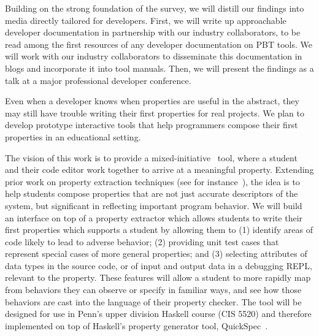 Building on the strong foundation of the survey, we will distill our findings
into media directly tailored for developers. First, we will write up
approachable developer documentation in partnership with our industry
collaborators, to be read among the first resources of any developer
documentation on PBT tools. We will work with our industry collaborators to
disseminate this documentation in blogs and incorporate it into tool
manuals. Then, we will present the findings as a talk at a
major professional developer conference.

%
Even when a developer knows when properties are useful in the abstract,
they may still have trouble writing their first properties
for real projects. We plan to develop prototype interactive tools that help
programmers compose their first properties in an educational setting.

The vision of this work is to provide a mixed-initiative~\cite{ref:allen1999mixed}
tool, where a student and their code editor work together to arrive at a
meaningful property. Extending prior work on property extraction techniques (see for
instance~\cite{ref:ammons2002mining, ref:le2018deep, ref:claessen2010quickspec,
smith_discovering_2017}), the idea is to help students compose properties that
are not just accurate descriptors of the system, but significant in reflecting
important program behavior. We will build an interface on top of a property
extractor which allows students to write their first properties which supports a
student by allowing them to (1) identify areas of code likely to lead to adverse behavior;
(2) providing unit test cases that represent special cases of more general
properties; and (3) selecting attributes of data types in the source code, or
of input and output data in a debugging REPL, relevant to the property. These
features will allow a student to more rapidly map from behaviors they can
observe or specify in familiar ways, and see how those behaviors are cast into
the language of their property checker.
%
The tool will be designed for use in Penn's upper division Haskell
course (CIS 5520) and therefore implemented on top of
Haskell's property
generator tool, QuickSpec~\cite{ref:claessen2010quickspec}.


